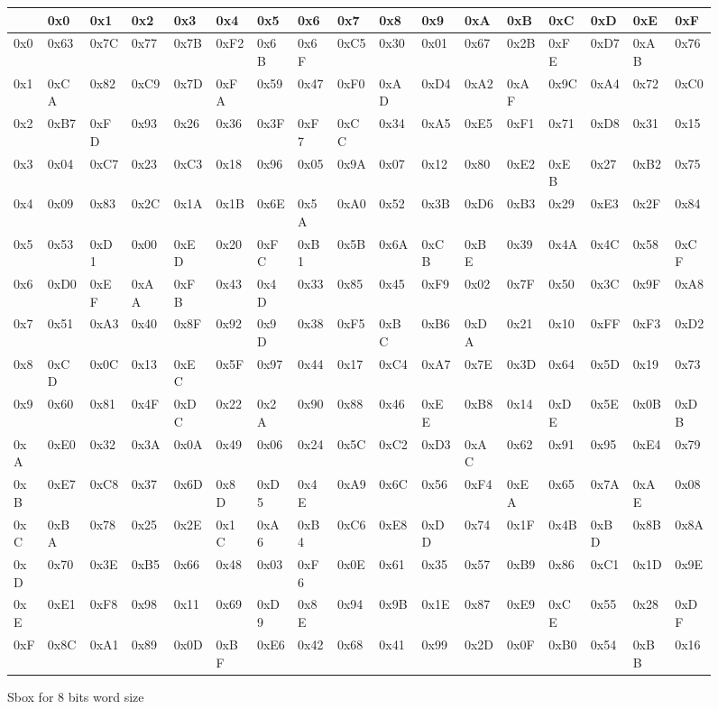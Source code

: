 \documentclass[a4paper,twoside]{llncs}
\begin{document}
\begin{figure}[h]{\tiny
\begin{center}
\begin{tabular}[]{|l||l|l|l|l|l|l|l|l|l|l|l|l|l|l|l|l|}\hline
    & 0x0  & 0x1  & 0x2  & 0x3  & 0x4  & 0x5  & 0x6  & 0x7  & 0x8  & 0x9  & 0xA  & 0xB  & 0xC  & 0xD  & 0xE  & 0xF \\\hline\hline
0x0 & 0x63 & 0x7C & 0x77 & 0x7B & 0xF2 & 0x6B & 0x6F & 0xC5 & 0x30 & 0x01 & 0x67 & 0x2B & 0xFE & 0xD7 & 0xAB & 0x76\\\hline
0x1 & 0xCA & 0x82 & 0xC9 & 0x7D & 0xFA & 0x59 & 0x47 & 0xF0 & 0xAD & 0xD4 & 0xA2 & 0xAF & 0x9C & 0xA4 & 0x72 & 0xC0 \\\hline
0x2 & 0xB7 & 0xFD & 0x93 & 0x26 & 0x36 & 0x3F & 0xF7 & 0xCC & 0x34 & 0xA5 & 0xE5 & 0xF1 & 0x71 & 0xD8 & 0x31 & 0x15 \\\hline
0x3 & 0x04 & 0xC7 & 0x23 & 0xC3 & 0x18 & 0x96 & 0x05 & 0x9A & 0x07 & 0x12 & 0x80 & 0xE2 & 0xEB & 0x27 & 0xB2 & 0x75 \\\hline
0x4 & 0x09 & 0x83 & 0x2C & 0x1A & 0x1B & 0x6E & 0x5A & 0xA0 & 0x52 & 0x3B & 0xD6 & 0xB3 & 0x29 & 0xE3 & 0x2F & 0x84 \\\hline
0x5 & 0x53 & 0xD1 & 0x00 & 0xED & 0x20 & 0xFC & 0xB1 & 0x5B & 0x6A & 0xCB & 0xBE & 0x39 & 0x4A & 0x4C & 0x58 & 0xCF \\\hline
0x6 & 0xD0 & 0xEF & 0xAA & 0xFB & 0x43 & 0x4D & 0x33 & 0x85 & 0x45 & 0xF9 & 0x02 & 0x7F & 0x50 & 0x3C & 0x9F & 0xA8 \\\hline
0x7 & 0x51 & 0xA3 & 0x40 & 0x8F & 0x92 & 0x9D & 0x38 & 0xF5 & 0xBC & 0xB6 & 0xDA & 0x21 & 0x10 & 0xFF & 0xF3 & 0xD2 \\\hline
0x8 & 0xCD & 0x0C & 0x13 & 0xEC & 0x5F & 0x97 & 0x44 & 0x17 & 0xC4 & 0xA7 & 0x7E & 0x3D & 0x64 & 0x5D & 0x19 & 0x73 \\\hline
0x9 & 0x60 & 0x81 & 0x4F & 0xDC & 0x22 & 0x2A & 0x90 & 0x88 & 0x46 & 0xEE & 0xB8 & 0x14 & 0xDE & 0x5E & 0x0B & 0xDB \\\hline
0xA & 0xE0 & 0x32 & 0x3A & 0x0A & 0x49 & 0x06 & 0x24 & 0x5C & 0xC2 & 0xD3 & 0xAC & 0x62 & 0x91 & 0x95 & 0xE4 & 0x79 \\\hline
0xB & 0xE7 & 0xC8 & 0x37 & 0x6D & 0x8D & 0xD5 & 0x4E & 0xA9 & 0x6C & 0x56 & 0xF4 & 0xEA & 0x65 & 0x7A & 0xAE & 0x08 \\\hline
0xC & 0xBA & 0x78 & 0x25 & 0x2E & 0x1C & 0xA6 & 0xB4 & 0xC6 & 0xE8 & 0xDD & 0x74 & 0x1F & 0x4B & 0xBD & 0x8B & 0x8A \\\hline
0xD & 0x70 & 0x3E & 0xB5 & 0x66 & 0x48 & 0x03 & 0xF6 & 0x0E & 0x61 & 0x35 & 0x57 & 0xB9 & 0x86 & 0xC1 & 0x1D & 0x9E \\\hline
0xE & 0xE1 & 0xF8 & 0x98 & 0x11 & 0x69 & 0xD9 & 0x8E & 0x94 & 0x9B & 0x1E & 0x87 & 0xE9 & 0xCE & 0x55 & 0x28 & 0xDF \\\hline
0xF & 0x8C & 0xA1 & 0x89 & 0x0D & 0xBF & 0xE6 & 0x42 & 0x68 & 0x41 & 0x99 & 0x2D & 0x0F & 0xB0 & 0x54 & 0xBB & 0x16 \\\hline
\end{tabular}
\end{center}}
\caption{Sbox for 8 bits word size}
\label{tab:sbox8}
\end{figure}
\end{document}
